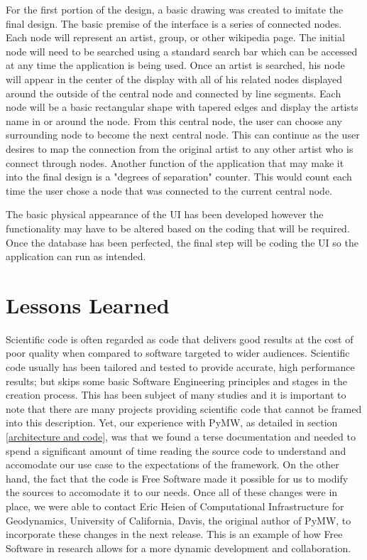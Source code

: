 \documentclass{sig-alternate}
\begin{document}
For the first portion of the design, a basic drawing was created to imitate the final design. The basic premise 
of the interface is a series of connected nodes. Each node will represent an artist, group, or other wikipedia 
page. The initial node will need to be searched using a standard search bar which can be accessed at any time 
the application is being used. Once an artist is searched, his node will appear in the center of the display 
with all of his related nodes displayed around the outside of the central node and connected by line segments. 
Each node will be a basic rectangular shape with tapered edges and display the artists name in or around the node. 
From this central node, the user can choose any surrounding node to become the next central node. This can continue 
as the user desires to map the connection from the original artist to any other artist who is connect through nodes.
Another function of the application that may make it into the final design is a "degrees of separation" counter. 
This would count each time the user chose a node that was connected to the current central node. 

The basic physical appearance of the UI has been developed however the functionality may have to be altered 
based on the coding that will be required. Once the database has been perfected, the final step will be 
coding the UI so the application can run as intended. 

\section{Lessons Learned}
\label{mistakes}

Scientific code is often regarded as code that delivers good results at the cost of poor quality when compared to
software targeted to wider audiences. Scientific code usually has been tailored and tested to provide accurate, high
performance results; but skips some basic Software Engineering principles and stages in the creation process. This has
been subject of many studies \cite{Li:2011:RSS:1985782.1985789,Phadke:2005:PRM:1145319.1145337} and it is important to
note that there are many projects providing scientific code that cannot be framed into this description. Yet, our
experience with PyMW, as detailed in section \ref{architecture and code}, was that we found a terse documentation and
needed to spend a significant amount of time reading the source code to understand and accomodate our use case to the
expectations of the framework. On the other hand, the fact that the code is Free Software made it possible for us to
modify the sources to accomodate it to our needs. Once all of these changes were in place, we were able to contact Eric
Heien of Computational Infrastructure for Geodynamics, University of California, Davis, the original author of PyMW, to
incorporate these changes in the next release. This is an example of how Free Software in research allows for a more
dynamic development and collaboration.
\end{document}
